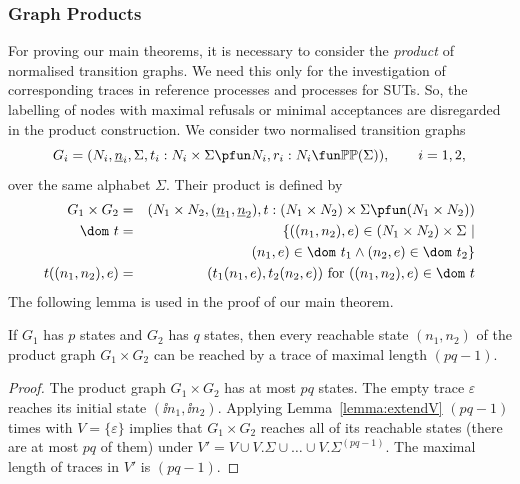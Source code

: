\subsubsection*{Graph Products}
\label{sec:GP}

For proving our main theorems, it is necessary to consider the \emph{product}
of normalised transition graphs. We need this only for the investigation of
corresponding traces in reference processes and processes for SUTs. So, the
labelling of nodes with maximal refusals or minimal acceptances are
disregarded in the product construction. We consider two normalised
transition graphs
\[
G_i = ( N_i, \ii n_i, \Sigma, t_i : N_i\times\Sigma \pfun N_i, r_i : N_i \fun \mathbb{P}\mathbb{P}(\Sigma)),\qquad i = 1,2,
\]
over the same alphabet $\Sigma$. Their product is defined by
%
\begin{eqnarray}
G_1\times G_2 & = & (N_1\times N_2,(\ii n_1,\ii n_2), t:(N_1\times N_2)\times\Sigma\pfun (N_1\times N_2))
\\
\dom~t & = & \{ ((n_1,n_2),e)\in (N_1\times N_2)\times\Sigma~|   \nonumber
\\ & & \tabc
(n_1,e)\in\dom~t_1\wedge
(n_2,e) \in\dom~t_2    \}
\\
t((n_1,n_2),e) & = & (t_1(n_1,e),t_2(n_2,e))\ \text{for $((n_1,n_2),e)\in\dom~t$}
\end{eqnarray}
%
The following lemma is used in the proof of our main theorem.
%
\begin{lemma}\label{lemma:reachproduc}
If $G_1$ has $p$ states and $G_2$ has $q$ states, then every reachable state
$(n_1,n_2)$ of the product graph $G_1\times G_2$ can be reached by a trace
of maximal length $(pq-1)$.
\end{lemma}
\begin{proof}
The product graph $G_1\times G_2$ has at most $pq$ states. The empty trace $\varepsilon$
reaches its initial state $(\ii n_1,\ii n_2)$. Applying Lemma~\ref{lemma:extendV}
$(pq-1)$ times with $V=\{\varepsilon \}$ implies that $G_1\times G_2$ reaches
all of its reachable states (there are at most $pq$ of them) under
$V' = V \cup V.\Sigma\cup\dots \cup V.\Sigma^{(pq-1)}$. The maximal length of traces in
$V'$ is $(pq-1)$.
\xbox
\end{proof}


